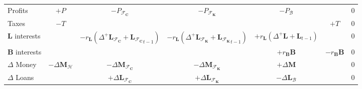 \begin{table}
\begin{tabular}{l|ccccc|l}
        Profits                & $+P$                            & $-P_{\mathcal{F}_\mathbf{C}}$                                                                               & $-P_{\mathcal{F}_\mathbf{K}}$                                                                               & $-P_\mathcal{B}$                                          &                     & 0        \\
        Taxes                  &
        $-T$                   &                                 &                                                                                                             &                                                                                                             & $+T$                                                      & 0                              \\
        \midrule
        $\mathbf{L}$ interests &                                 & $-r_\mathbf{L} (\Delta^+\mathbf{L}_{\mathcal{F}_\mathbf{C}} + {\mathbf{L}_{\mathcal{F}_\mathbf{C}}}_{t-1})$ & $-r_\mathbf{L} (\Delta^+\mathbf{L}_{\mathcal{F}_\mathbf{K}} + {\mathbf{L}_{\mathcal{F}_\mathbf{K}}}_{t-1})$ & $+r_\mathbf{L} (\Delta^+\mathbf{L} + {\mathbf{L}}_{t-1})$ &                     & 0        \\
        $\mathbf{B}$ interests &
                               &                                 &                                                                                                             & $+r_\mathbf{B}\mathbf{B}$                                                                                   & $-r_\mathbf{B}\mathbf{B}$                                 & 0                              \\
        \midrule
        $\Delta$ Money         & $-\Delta\mathbf{M}_\mathcal{H}$ & $-\Delta\mathbf{M}_{\mathcal{F}_\mathbf{C}}$                                                                & $-\Delta\mathbf{M}_{\mathcal{F}_\mathbf{K}}$                                                                & $+\Delta\mathbf{M}$                                       &                     & 0        \\
        $\Delta$ Loans         &                                 & $+\Delta\mathbf{L}_{\mathcal{F}_\mathbf{C}}$                                                                & $+\Delta\mathbf{L}_{\mathcal{F}_\mathbf{K}}$                                                                & $-\Delta\mathbf{L}_{\mathcal{B}}$                         &                     & 0        \\

\end{tabular}
\end{table}

